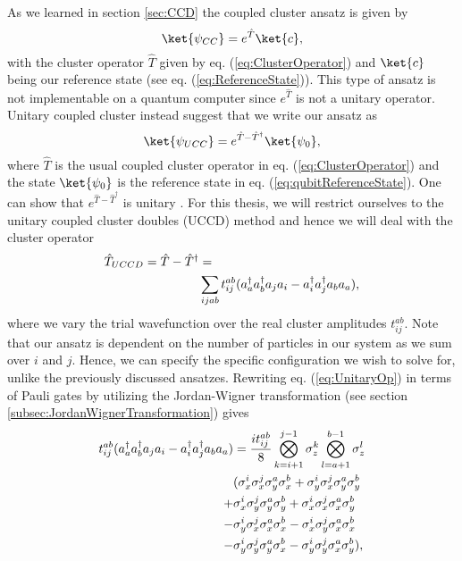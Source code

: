 As we learned in section \ref{sec:CCD} the coupled cluster ansatz is given by 
$$\ket{\psi_{CC}}  = e^{\hat{T}} \ket{c} ,$$
with the cluster operator $\hat{T}$ given by eq. (\ref{eq:ClusterOperator}) and $\ket{c}$ being our reference state (see eq. (\ref{eq:ReferenceState})). This type of ansatz is not implementable on a quantum computer since $e^{\hat{T}}$ is not a unitary operator. Unitary coupled cluster instead suggest that we write our ansatz as
\begin{equation}
    \label{eq:UnitaryCoupledClusterAnsatz}
    \ket{\psi_{UCC}} = e^{\hat{T} - \hat{T}^\dagger}\ket{\psi_0},
\end{equation}
where $\hat{T}$ is the usual coupled cluster operator in eq. (\ref{eq:ClusterOperator}) and the state $\ket{\psi_0}$ is the reference state in eq. (\ref{eq:qubitReferenceState}).
One can show that $e^{\hat{T} - \hat{T}^\dagger}$ is unitary \cite{UCCDArticle}.
For this thesis, we will restrict ourselves to the unitary coupled cluster doubles (UCCD) method and hence we will deal with the cluster operator
\begin{align}
    \label{eq:UnitaryOp}
    \hat{T}_{UCCD} = \hat{T} - \hat{T}^\dagger &=  \notag \\
     &\sum_{ijab} t_{ij}^{ab}(a^\dagger_a a^\dagger_b a_j a_i - a^\dagger_i a^\dagger_j a_b a_a),
\end{align}
where we vary the trial wavefunction over the real cluster amplitudes $t_{ij}^{ab}$. Note that our ansatz is dependent on the number of particles in our system as we sum over $i$ and $j$. Hence, we can specify the specific configuration we wish to solve for, unlike the previously discussed ansatzes. 
Rewriting eq. (\ref{eq:UnitaryOp}) in terms of Pauli gates by utilizing the Jordan-Wigner transformation (see section \ref{subsec:JordanWignerTransformation}) gives \cite{UCCDArticle}
\begin{align}
    \label{eq:UCCDoublesGates}
    t_{ij}^{ab}(a^\dagger_a a^\dagger_b a_j a_i - a^\dagger_i a^\dagger_j a_b a_a) &= \frac{it_{ij}^{ab}}{8} \bigotimes_{k=i+1}^{j-1}\sigma_z^k \bigotimes_{l=a+1}^{b-1}\sigma_z^l \notag \\
    &(\sigma_x^i \sigma_x^j \sigma_y^a \sigma_x^b + \sigma_y^i \sigma_x^j \sigma_y^a \sigma_y^b \notag \\
    +&\sigma_x^i\sigma_y^j \sigma_y^a \sigma_y^b + \sigma_x^i \sigma_x^j \sigma_x^a \sigma_y^b \notag \\
    -& \sigma_y^i \sigma_x^j \sigma_x^a \sigma_x^b - \sigma_x^i \sigma_y^j \sigma_x^a \sigma_x^b \notag \\
    -&\sigma_y^i \sigma_y^j \sigma_y^a \sigma_x^b - \sigma_y^i \sigma_y^j \sigma_x^a \sigma_y^b ),
\end{align}
